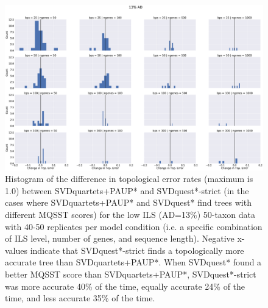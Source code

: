 \clearpage
\begin{figure}
\includegraphics[width=\textwidth]{svdquest-figs/differentscore-rfdists-hist-cgenes-13.eps}
\caption[Histogram of differences in topological error between SVDquartets+PAUP* and SVDquest*-strict for the low ILS 50-taxon datasets]
{Histogram of the difference in topological error rates (maximum is 1.0) between
  SVDquartets+PAUP* and SVDquest*-strict (in the cases where SVDquartets+PAUP* and SVDquest* find trees
  with different MQSST scores)  for the low ILS (AD=13\%) 50-taxon data
  with 40-50 replicates per model condition (i.e. a specific combination of ILS level, number of genes, and sequence length). 
  Negative x-values indicate that SVDquest*-strict finds a topologically more accurate tree than
  SVDquartets+PAUP*.
When SVDquest* found a better MQSST score than SVDquartets+PAUP*, SVDquest*-strict was more
accurate  40\% of the time, equally accurate 24\% of the time, and
less accurate 35\% of the time.
}
\label{fig:s4}
\end{figure}




\clearpage

